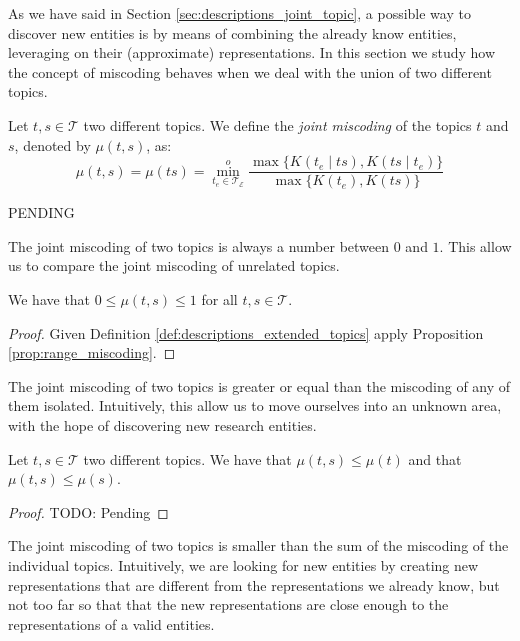 As we have said in Section \ref{sec:descriptions_joint_topic}, a possible way to discover new entities is by means of combining the already know entities, leveraging on their (approximate) representations. In this section we study how the concept of miscoding behaves when we deal with the union of two different topics.

\begin{definition}
Let $t, s \in \mathcal{T}$ two different topics. We define the \emph{joint miscoding} of the topics $t$ and $s$, denoted by $\mu(t, s)$, as:
\[
\mu(t, s) = \mu(ts) = \overset{o}{ \underset{t_e \in \mathcal{T}_\mathcal{E}} \min} \frac{ \max\{ K(t_e \mid ts), K(ts \mid t_e) \} } { \max\{ K(t_e), K(ts) \} }
\]
\end{definition}

\begin{example}
{\color{red} PENDING}
\end{example}

The joint miscoding of two topics is always a number between $0$ and $1$. This allow us to compare the joint miscoding of unrelated topics.

\begin{proposition}
We have that $0 \leq \mu(t,s) \leq 1$ for all $t, s \in \mathcal{T}$.
\end{proposition}
\begin{proof}
Given Definition \ref{def:descriptions_extended_topics} apply Proposition \ref{prop:range_miscoding}.
\end{proof}

The joint miscoding of two topics is greater or equal than the miscoding of any of them isolated. Intuitively, this allow us to move ourselves into an unknown area, with the hope of discovering new research entities.

\begin{proposition}
Let $t, s \in \mathcal{T}$ two different topics. We have that $\mu(t,s) \leq \mu(t)$ and that $\mu(t,s) \leq \mu(s)$.
\end{proposition}
\begin{proof}
{\color{red} TODO: Pending}
\end{proof}

The joint miscoding of two topics is smaller than the sum of the miscoding of the individual topics. Intuitively, we are looking for new entities by creating new representations that are different from the representations we already know, but not too far so that that the new representations are close enough to the representations of a valid entities.

